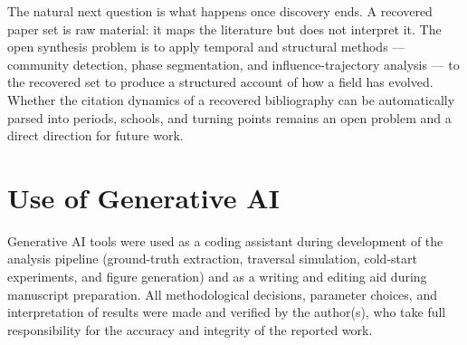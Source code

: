 \documentclass[manuscript,review,anonymous]{acmart}
\begin{document}
The natural next question is what happens once discovery ends. A recovered paper set is
raw material: it maps the literature but does not interpret it. The open synthesis problem
is to apply temporal and structural methods --- community detection, phase segmentation,
and influence-trajectory analysis --- to the recovered set to produce a structured account
of how a field has evolved. Whether the citation dynamics of a recovered bibliography can
be automatically parsed into periods, schools, and turning points remains an open
problem and a direct direction for future work.

\section*{Use of Generative AI}
Generative AI tools were used as a coding assistant during development of the analysis
pipeline (ground-truth extraction, traversal simulation, cold-start experiments, and figure
generation) and as a writing and editing aid during manuscript preparation. All methodological
decisions, parameter choices, and interpretation of results were made and verified by the
author(s), who take full responsibility for the accuracy and integrity of the reported work.



\end{document}
